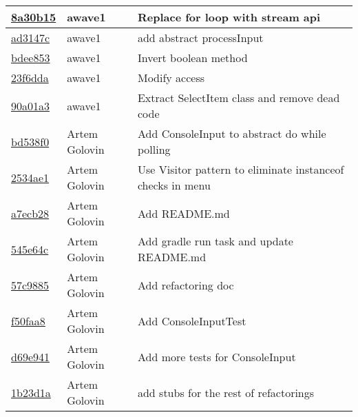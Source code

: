 \begin{tabularx}{\textwidth}{l l X}
\href{https://github.com/awave1/assessment-loan-system/commit/8a30b154c6545dde2ab95a9f2c91f72e06910953}{8a30b15} & awave1 & Replace for loop with stream api\\ \hline
\href{https://github.com/awave1/assessment-loan-system/commit/ad3147c13281bdfa24cbdba143867c95cdd55d1f}{ad3147c} & awave1 & add abstract processInput\\ \hline
\href{https://github.com/awave1/assessment-loan-system/commit/bdee853e6e00b86b70686100d6affeb4c5e53a4b}{bdee853} & awave1 & Invert boolean method\\ \hline
\href{https://github.com/awave1/assessment-loan-system/commit/23f6ddaf5e3335cb94619026282a5b682db98586}{23f6dda} & awave1 & Modify access\\ \hline
\href{https://github.com/awave1/assessment-loan-system/commit/90a01a3f7f0fdd2e2135b16318e624eea0bfbd64}{90a01a3} & awave1 & Extract SelectItem class and remove dead code\\ \hline
\href{https://github.com/awave1/assessment-loan-system/commit/bd538f05a6fbff8283b397c9a265040ab082542d}{bd538f0} & Artem Golovin & Add ConsoleInput to abstract do{} while polling\\ \hline
\href{https://github.com/awave1/assessment-loan-system/commit/2534ae1e8b711ad62fca8e783b861151951a8f02}{2534ae1} & Artem Golovin & Use Visitor pattern to eliminate instanceof checks in menu\\ \hline
\href{https://github.com/awave1/assessment-loan-system/commit/a7ecb285443ab25bb15ea940ba888ca3d7cc5e8d}{a7ecb28} & Artem Golovin & Add README.md\\ \hline
\href{https://github.com/awave1/assessment-loan-system/commit/545e64c6fa7258fd3c76e5644bdeac9424c8ed8c}{545e64c} & Artem Golovin & Add gradle run task and update README.md\\ \hline
\href{https://github.com/awave1/assessment-loan-system/commit/57c98855efe469e298c817cadc8d93f591cabf1a}{57c9885} & Artem Golovin & Add refactoring doc\\ \hline
\href{https://github.com/awave1/assessment-loan-system/commit/f50faa890a5b87f64f8034649d3f740feecbcdbc}{f50faa8} & Artem Golovin & Add ConsoleInputTest\\ \hline
\href{https://github.com/awave1/assessment-loan-system/commit/d69e941c0d7b9494f5b554c5c8f4dc3ef35b15df}{d69e941} & Artem Golovin & Add more tests for ConsoleInput\\ \hline
\href{https://github.com/awave1/assessment-loan-system/commit/1b23d1ae9d15f13ed7fcde87981b15304efd5828}{1b23d1a} & Artem Golovin & add stubs for the rest of refactorings\\ \hline

\end{tabularx}
